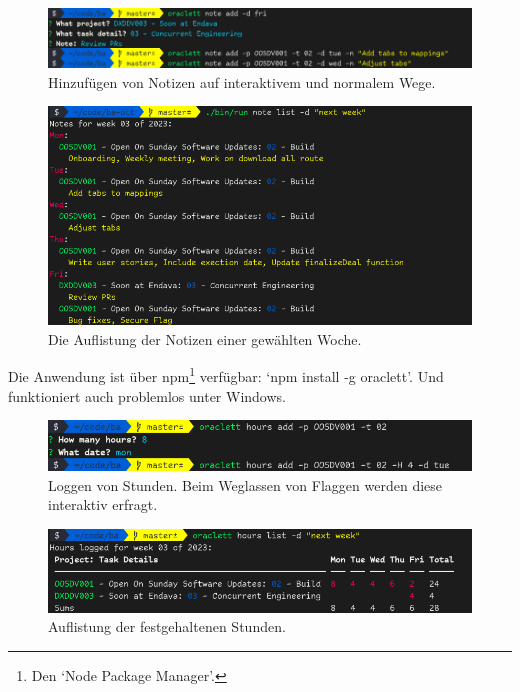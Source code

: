 \documentclass[oneside,bibliography=totocnumbered,BCOR=5mm]{scrbook}
\begin{document}
\begin{figure}[H]
  \centering
  \includegraphics[scale=0.5]{note-add.png}
  \caption{Hinzufügen von Notizen auf interaktivem und normalem Wege.}
  \label{fig:note-add}
\end{figure}

\begin{figure}[H]
  \centering
  \includegraphics[scale=0.5]{note-list.png}
  \caption{Die Auflistung der Notizen einer gewählten Woche.}
  \label{fig:note-list}
\end{figure}

Die Anwendung ist über npm\footnote{Den `Node Package Manager'.} verfügbar: `npm
install -g oraclett'. Und funktioniert auch problemlos unter Windows.

\begin{figure}[H]
  \centering
  \includegraphics[scale=0.5]{hours-add.png}
  \caption{Loggen von Stunden. Beim Weglassen von Flaggen werden diese interaktiv erfragt.}
  \label{fig:hours-add}
\end{figure}

\begin{figure}[H]
  \centering
  \includegraphics[scale=0.5]{hours-list-real.png}
  \caption{Auflistung der festgehaltenen Stunden.}
  \label{fig:hours-list}
\end{figure}
\end{document}
